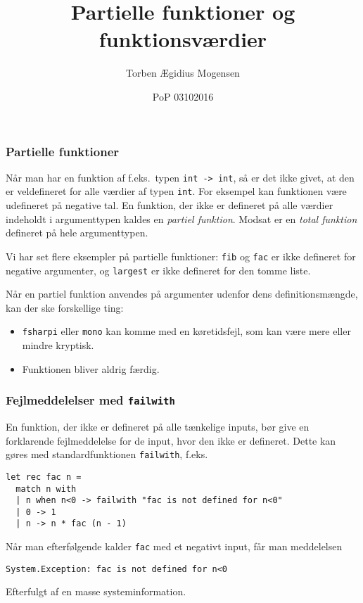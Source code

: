 \documentclass{beamer}
\title{Partielle funktioner og funktionsværdier}
\date[2016]{PoP 03102016}
\author{Torben Ægidius Mogensen}
\begin{document}
\begin{frame}
\titlepage
\end{frame}






\begin{frame}
\frametitle{Partielle funktioner}

Når man har en funktion af f.eks.\ typen \texttt{int -> int}, så er
det ikke givet, at den er veldefineret for alle værdier af typen
\texttt{int}.  For eksempel kan funktionen være udefineret på negative
tal.  En funktion, der ikke er defineret på alle værdier indeholdt i
argumenttypen kaldes en \emph{partiel funktion}.  Modsat er en
\emph{total funktion} defineret på hele argumenttypen.

Vi har set flere eksempler på partielle funktioner: \texttt{fib} og
\texttt{fac} er ikke defineret for negative argumenter, og
\texttt{largest} er ikke defineret for den tomme liste.

Når en partiel funktion anvendes på argumenter udenfor dens
definitionsmængde, kan der ske forskellige ting:

\begin{itemize}
\item \texttt{fsharpi} eller \texttt{mono} kan komme med en
  køretidsfejl, som kan være mere eller mindre kryptisk.
\item Funktionen bliver aldrig færdig.
\end{itemize}

\end{frame}

\begin{frame}[fragile=singleslide]
\frametitle{Fejlmeddelelser med \texttt{failwith}}

En funktion, der ikke er defineret på alle tænkelige inputs, bør give
en forklarende fejlmeddelelse for de input, hvor den ikke er
defineret. Dette kan gøres med standardfunktionen \texttt{failwith},
f.eks.

\begin{verbatim}
let rec fac n =
  match n with
  | n when n<0 -> failwith "fac is not defined for n<0"
  | 0 -> 1
  | n -> n * fac (n - 1)
\end{verbatim}

Når man efterfølgende kalder \texttt{fac} med et negativt input,
får man meddelelsen

\begin{verbatim}
System.Exception: fac is not defined for n<0
\end{verbatim}

Efterfulgt af en masse systeminformation.

\end{frame}
\end{document}
